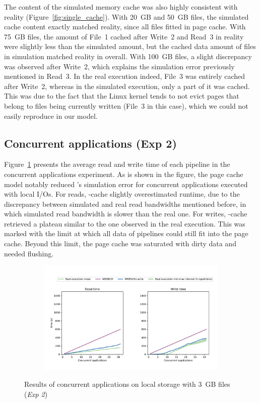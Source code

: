 The content of the simulated memory cache was also highly consistent with 
reality (Figure~\ref{fig:single_cache}). With 20~GB and 50~GB files, 
the simulated cache content exactly matched reality, since all files fitted 
in page cache. With 75~GB files, the amount of File~1 cached after Write~2 
and Read~3 in reality were slightly less than the simulated amount, but 
the cached data amount of files in simulation matched reality in overall.
With 100~GB files, a slight discrepancy was observed after Write~2, 
which explains the simulation error previously mentioned in Read~3. 
In the real execution indeed, File~3 was entirely cached after Write~2, 
whereas in the simulated execution, only a part of it was cached. 
This was due to the fact that the Linux kernel tends to not evict pages that
belong to files being currently written (File~3 in this case), which we could 
not easily reproduce in our model.

\subsection{Concurrent applications (Exp 2)}

Figure~\ref{fig:multi_local} presents the average read and write time 
of each pipeline in the concurrent applications experiment.
As is shown in the figure, the page cache model notably reduced \wrench's 
simulation error for concurrent applications executed with local I/Os. 
For reads, \wrench-cache slightly overestimated runtime, due to the 
discrepancy between simulated and real read bandwidths mentioned before, 
in which simulated read bandwidth is slower than the real one.
For writes, \wrench-cache retrieved a plateau similar to the one observed 
in the real execution. This was marked with the limit at which all data of 
pipelines could still fit into the page cache. Beyond this limit, the page cache 
was saturated with dirty data and needed flushing.

\begin{figure}[!h]
    \begin{subfigure}{\linewidth}
        \centering
        \includegraphics[width=\linewidth]{result/multi/figures/multi_local.pdf}
    \end{subfigure}
    \caption{Results of concurrent applications on local storage with 3~GB files 
    (\textit{Exp 2})}
    \label{fig:multi_local}
\end{figure}

